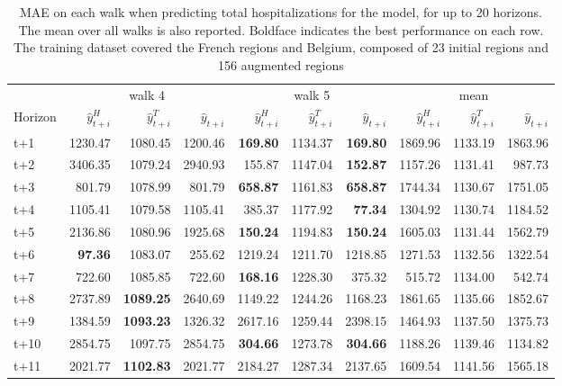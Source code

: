 \begin{table}[H]
\centering
\caption{MAE on each walk when predicting total hospitalizations for the model, for up to 20 horizons. The mean over all walks is also reported. Boldface indicates the best performance on each row. The training dataset covered the French regions and Belgium, composed of 23 initial regions and 156 augmented regions }
\label{tab:MAE_walk_assemble}
\begin{tabular}{lrrrrrrrrr}
\toprule
 & \multicolumn{3}{c}{walk 4} & \multicolumn{3}{c}{walk 5} & \multicolumn{3}{c}{mean} 
\\

\cmidrule(lr){2-4} \cmidrule(lr){5-7} \cmidrule(lr){8-10} 
Horizon & $\hat{y}_{t+i}^H$ & $\hat{y}_{t+i}^T$ & $\hat{y}_{t+i}$ & $\hat{y}_{t+i}^H$ & $\hat{y}_{t+i}^T$ & $\hat{y}_{t+i}$ & $\hat{y}_{t+i}^H$ & $\hat{y}_{t+i}^T$ & $\hat{y}_{t+i}$ \\
\midrule
t+1  & 1230.47  & 1080.45  & 1200.46  & \textbf{169.80}  & 1134.37  & \textbf{169.80}  & 1869.96  & 1133.19  & 1863.96  \\
t+2  & 3406.35  & 1079.24  & 2940.93  & 155.87  & 1147.04  & \textbf{152.87}  & 1157.26  & 1131.41  & 987.73  \\
t+3  & 801.79  & 1078.99  & 801.79  & \textbf{658.87}  & 1161.83  & \textbf{658.87}  & 1744.34  & 1130.67  & 1751.05  \\
t+4  & 1105.41  & 1079.58  & 1105.41  & 385.37  & 1177.92  & \textbf{77.34}  & 1304.92  & 1130.74  & 1184.52  \\
t+5  & 2136.86  & 1080.96  & 1925.68  & \textbf{150.24}  & 1194.83  & \textbf{150.24}  & 1605.03  & 1131.44  & 1562.79  \\
t+6  & \textbf{97.36}  & 1083.07  & 255.62  & 1219.24  & 1211.70  & 1218.85  & 1271.53  & 1132.56  & 1322.54  \\
t+7  & 722.60  & 1085.85  & 722.60  & \textbf{168.16}  & 1228.30  & 375.32  & 515.72  & 1134.00  & 542.74  \\
t+8  & 2737.89  & \textbf{1089.25}  & 2640.69  & 1149.22  & 1244.26  & 1168.23  & 1861.65  & 1135.66  & 1852.67  \\
t+9  & 1384.59  & \textbf{1093.23}  & 1326.32  & 2617.16  & 1259.44  & 2398.15  & 1464.93  & 1137.50  & 1375.73  \\
t+10  & 2854.75  & 1097.75  & 2854.75  & \textbf{304.66}  & 1273.78  & \textbf{304.66}  & 1188.26  & 1139.46  & 1134.82  \\
t+11  & 2021.77  & \textbf{1102.83}  & 2021.77  & 2184.27  & 1287.34  & 2137.65  & 1609.54  & 1141.56  & 1565.18  \\

\end{tabular}
\end{table}
